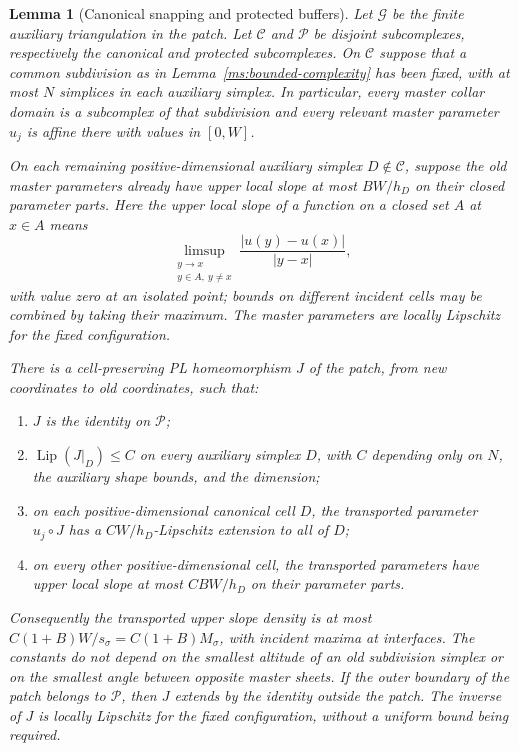 \documentclass[11pt]{article}
\numberwithin{equation}{section}
\newtheorem{lemma}[theorem]{Lemma}
\theoremstyle{definition}
\theoremstyle{remark}
\DeclareMathOperator{\Lip}{Lip}
\begin{document}
\begin{lemma}[Canonical snapping and protected buffers]
\label{ms:snapping}
Let $\mathcal G$ be the finite auxiliary triangulation in the patch.
Let $\mathcal C$ and $\mathcal P$ be disjoint subcomplexes, respectively
the canonical and protected subcomplexes.  On $\mathcal C$ suppose
that a common subdivision as in
Lemma~\ref{ms:bounded-complexity} has been fixed, with at most $N$
simplices in each auxiliary simplex.  In particular, every master
collar domain is a subcomplex of that subdivision and every relevant
master parameter $u_j$ is affine there with values in $[0,W]$.

On each remaining positive-dimensional auxiliary simplex
$D\notin\mathcal C$, suppose the old master parameters already have
upper local slope at most $B W/h_D$ on their closed parameter parts.
Here the upper local slope of a function on a closed set $A$ at
$x\in A$ means
\[
 \limsup_{\substack{y\to x\\y\in A,\ y\ne x}}
 \frac{|u(y)-u(x)|}{|y-x|},
\]
with value zero at an isolated point; bounds on different incident
cells may be combined by taking their maximum.  The master
parameters are locally Lipschitz for the fixed configuration.

There is a cell-preserving PL homeomorphism $J$ of the patch, from
new coordinates to old coordinates, such that:
\begin{enumerate}
\item $J$ is the identity on $\mathcal P$;
\item $\Lip(J|_D)\leq C$ on every auxiliary simplex $D$, with $C$
depending only on $N$, the auxiliary shape bounds, and the dimension;
\item on each positive-dimensional canonical cell $D$, the transported parameter
$u_j\circ J$ has a $C W/h_D$-Lipschitz extension to all of $D$;
\item on every other positive-dimensional cell, the transported parameters have upper
local slope at most $C B W/h_D$ on their parameter parts.
\end{enumerate}
Consequently the transported upper slope density is at most
$C(1+B)W/s_\sigma=C(1+B)M_\sigma$, with incident maxima at
interfaces.  The constants do not depend on the smallest altitude
of an old subdivision simplex or on the smallest angle between
opposite master sheets.
If the outer boundary of the patch belongs to $\mathcal P$, then
$J$ extends by the identity outside the patch.  The inverse of $J$
is locally Lipschitz for the fixed configuration, without a uniform
bound being required.
\end{lemma}
\end{document}
